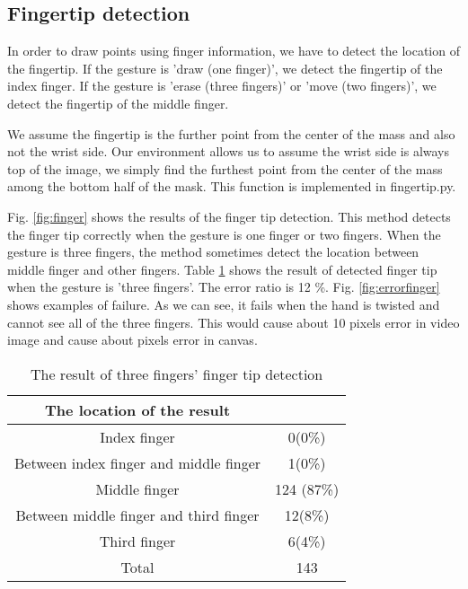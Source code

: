 \subsection{Fingertip detection}
In order to draw points using finger information, we have to detect the location of the fingertip.
If the gesture is 'draw (one finger)', we detect the fingertip of the index finger. 
If the gesture is 'erase (three fingers)' or 'move (two fingers)', we detect the fingertip of the middle finger. \par
We assume the fingertip is the further point from the center of the mass and also not the wrist side.
Our environment allows us to assume the wrist side is always top of the image, we simply find the furthest point from the center of the mass among the bottom half of the mask.
This function is implemented in fingertip.py. 

Fig. \ref{fig:finger} shows the results of the finger tip detection.
This method detects the finger tip correctly when the gesture is one finger or two fingers.
When the gesture is three fingers, the method sometimes detect the location between middle finger and other fingers.
Table \ref{tb:finger} shows the result of detected finger tip when the gesture is 'three fingers'.
The error ratio is 12 \%. Fig. \ref{fig:errorfinger} shows examples of failure. As we can see, it fails when the hand is twisted and cannot see all of the three fingers. This would cause about 10 pixels error in video image and cause about pixels error in canvas.
\begin{table}
 \caption{The result of three fingers' finger tip detection}
 \label{tb:finger}
 \begin{tabular}{|c|c|}
 \hline
 The location of the result &  \\ \hline
 Index finger & 0(0\%) \\ \hline
 Between index finger and middle finger & 1(0\%) \\ \hline
 Middle finger & 124 (87\%) \\ \hline
 Between middle finger and third finger & 12(8\%) \\ \hline
 Third finger & 6(4\%) \\ \hline
 Total & 143 \\ \hline
 \end{tabular}
\end{table}
